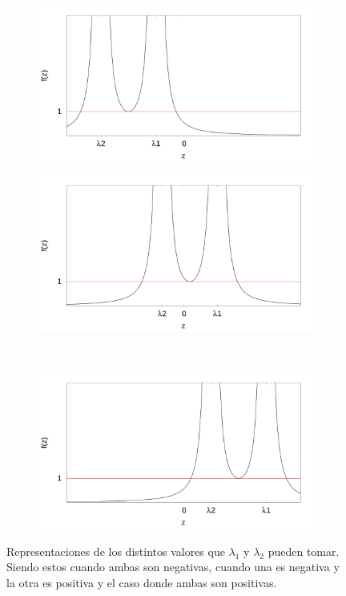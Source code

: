 \documentclass[../tesis_main_file.tex]{subfiles}
\begin{document}
\begin{figure}[h]
\centering
 \begin{subfigure}[b]{0.4\textwidth}
 	 \includegraphics[width=\textwidth]{grafica_lambdas_negativas.png}
 	 \caption{}
 	 \label{fig:lamdas_negativas}
 \end{subfigure}
 
 \begin{subfigure}[b]{0.4\textwidth}
 \includegraphics[width=\textwidth]{grafica_lambdas_alternadas.png}
 \caption{}
 \label{fig:lamdas_alternadas}
 \end{subfigure}
 ~
  \begin{subfigure}[b]{0.4\textwidth}
 \includegraphics[width=\textwidth]{grafica_lambdas_positivas.png}
  \caption{}
 \label{fig:lamdas_positivas}
 \end{subfigure}
 \caption{Representaciones de los distintos valores que $\lambda_1$ y $\lambda_2$ pueden tomar. Siendo estos cuando ambas son negativas, cuando una es negativa y la otra es positiva y el caso donde ambas son positivas.}\label{fig:valores_lambda}
\end{figure}
\end{document}
